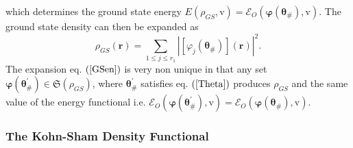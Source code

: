 \documentclass[aps,preprint]{revtex4}%
\begin{document}
which determines the ground state energy $E\left(  \rho_{GS}\boldsymbol{,}%
\mathrm{v}\right)  =\mathcal{E}_{O}\left(  \boldsymbol{\varphi}\left(
\boldsymbol{\theta}_{\#}\right)  ,\mathrm{v}\right)  .$ The ground state
density can then be expanded as
\begin{equation}
\rho_{GS}\left(  \boldsymbol{r}\right)  =\sum_{1\leq j\leq r_{1}}\left\vert
\overset{}{\left[  \varphi_{j}\left(  \boldsymbol{\theta}_{\#}\right)
\right]  \left(  \boldsymbol{r}\right)  }\right\vert ^{2}. \label{GSen}%
\end{equation}
The expansion eq. $\left(  \ref{GSen}\right)  $ is very non unique in that any
set $\boldsymbol{\varphi}\left(  \boldsymbol{\theta}_{\#}^{\prime}\right)
\in\mathfrak{S}\left(  \rho_{GS}\right)  $, where $\boldsymbol{\theta}%
_{\#}^{\prime}$ satisfies eq. $\left(  \ref{Theta}\right)  $ produces
$\rho_{GS}$ and the same value of the energy functional i.e. $\mathcal{E}%
_{O}\left(  \boldsymbol{\varphi}\left(  \boldsymbol{\theta}_{\#}^{\prime
}\right)  ,\mathrm{v}\right)  =\mathcal{E}_{O}\left(  \boldsymbol{\varphi
}\left(  \boldsymbol{\theta}_{\#}\right)  ,\mathrm{v}\right)  $.

\subsubsection{The Kohn-Sham Density Functional\label{KSDF}}
\end{document}
